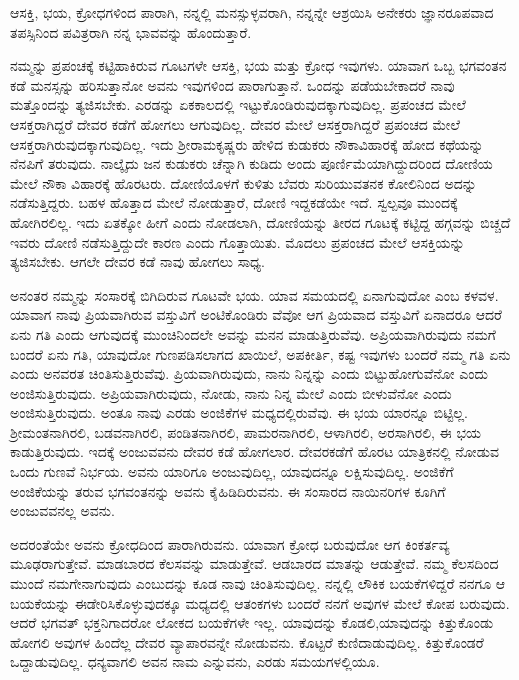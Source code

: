 \begin{artha}
ಆಸಕ್ತಿ, ಭಯ, ಕ್ರೋಧಗಳಿಂದ ಪಾರಾಗಿ, ನನ್ನಲ್ಲಿ ಮನಸ್ಸುಳ್ಳವರಾಗಿ, ನನ್ನನ್ನೇ ಆಶ್ರಯಿಸಿ ಅನೇಕರು ಜ್ಞಾನರೂಪವಾದ ತಪಸ್ಸಿನಿಂದ ಪವಿತ್ರರಾಗಿ ನನ್ನ ಭಾವವನ್ನು ಹೊಂದುತ್ತಾರೆ.
\end{artha}

ನಮ್ಮನ್ನು ಪ್ರಪಂಚಕ್ಕೆ ಕಟ್ಟಿಹಾಕಿರುವ ಗೂಟಗಳೇ ಆಸಕ್ತಿ, ಭಯ ಮತ್ತು ಕ್ರೋಧ ಇವುಗಳು. ಯಾವಾಗ ಒಬ್ಬ ಭಗವಂತನ ಕಡೆ ಮನಸ್ಸನ್ನು ಹರಿಸುತ್ತಾನೋ ಅವನು ಇವುಗಳಿಂದ ಪಾರಾಗುತ್ತಾನೆ. ಒಂದನ್ನು ಪಡೆಯಬೇಕಾದರೆ ನಾವು ಮತ್ತೊಂದನ್ನು ತ್ಯಜಿಸಬೇಕು. ಎರಡನ್ನು ಏಕಕಾಲದಲ್ಲಿ ಇಟ್ಟುಕೊಂಡಿರುವುದಕ್ಕಾಗುವುದಿಲ್ಲ. ಪ್ರಪಂಚದ ಮೇಲೆ ಆಸಕ್ತರಾಗಿದ್ದರೆ ದೇವರ ಕಡೆಗೆ ಹೋಗಲು ಆಗುವುದಿಲ್ಲ. ದೇವರ ಮೇಲೆ ಆಸಕ್ತರಾಗಿದ್ದರೆ ಪ್ರಪಂಚದ ಮೇಲೆ ಆಸಕ್ತರಾಗಿರುವುದಕ್ಕಾಗುವುದಿಲ್ಲ. ಇದು ಶ‍್ರೀರಾಮಕೃಷ್ಣರು ಹೇಳಿದ ಕುಡುಕರು ನೌಕಾವಿಹಾರಕ್ಕೆ ಹೋದ ಕಥೆಯನ್ನು ನೆನಪಿಗೆ ತರುವುದು. ನಾಲ್ಕೈದು ಜನ ಕುಡುಕರು ಚೆನ್ನಾಗಿ ಕುಡಿದು ಅಂದು ಪೂರ್ಣಿಮೆಯಾಗಿ\-ದ್ದುದರಿಂದ ದೋಣಿಯ ಮೇಲೆ ನೌಕಾ ವಿಹಾರಕ್ಕೆ ಹೊರಟರು. ದೋಣಿಯೊಳಗೆ ಕುಳಿತು ಬೆವರು ಸುರಿಯುವತನಕ ಕೋಲಿನಿಂದ ಅದನ್ನು ನಡೆಸುತ್ತಿದ್ದರು. ಬಹಳ ಹೊತ್ತಾದ ಮೇಲೆ ನೋಡುತ್ತಾರೆ, ದೋಣಿ ಇದ್ದಕಡೆಯೇ ಇದೆ. ಸ್ವಲ್ಪವೂ ಮುಂದಕ್ಕೆ ಹೋಗಿರಲಿಲ್ಲ. ಇದು ಏತಕ್ಕೋ ಹೀಗೆ ಎಂದು ನೋಡಲಾಗಿ, ದೋಣಿಯನ್ನು ತೀರದ ಗೂಟಕ್ಕೆ ಕಟ್ಟಿದ್ದ ಹಗ್ಗವನ್ನು ಬಿಚ್ಚದೆ ಇವರು ದೋಣಿ ನಡೆಸುತ್ತಿದ್ದುದೇ ಕಾರಣ ಎಂದು ಗೊತ್ತಾಯಿತು. ಮೊದಲು ಪ್ರಪಂಚದ ಮೇಲೆ ಆಸಕ್ತಿಯನ್ನು ತ್ಯಜಿಸಬೇಕು. ಆಗಲೇ ದೇವರ ಕಡೆ ನಾವು ಹೋಗಲು ಸಾಧ್ಯ.

ಅನಂತರ ನಮ್ಮನ್ನು ಸಂಸಾರಕ್ಕೆ ಬಿಗಿದಿರುವ ಗೂಟವೇ ಭಯ. ಯಾವ ಸಮಯದಲ್ಲಿ ಏನಾಗುವುದೋ ಎಂಬ ಕಳವಳ. ಯಾವಾಗ ನಾವು ಪ್ರಿಯವಾಗಿರುವ ವಸ್ತುವಿಗೆ ಅಂಟಿಕೊಂಡಿರು ವೆವೋ ಆಗ ಪ್ರಿಯವಾದ ವಸ್ತುವಿಗೆ ಏನಾದರೂ ಆದರೆ ಏನು ಗತಿ ಎಂದು ಆಗುವುದಕ್ಕೆ ಮುಂಚಿನಿಂದಲೇ ಅವನ್ನು ಮನನ ಮಾಡುತ್ತಿರುವೆವು. ಅಪ್ರಿಯವಾಗಿರುವುದು ನಮಗೆ ಬಂದರೆ ಏನು ಗತಿ, ಯಾವುದೋ ಗುಣಪಡಿಸಲಾಗದ ಖಾಯಿಲೆ, ಅಪಕೀರ್ತಿ, ಕಷ್ಟ ಇವುಗಳು ಬಂದರೆ ನಮ್ಮ ಗತಿ ಏನು ಎಂದು ಅನವರತ ಚಿಂತಿಸುತ್ತಿರುವೆವು. ಪ್ರಿಯವಾಗಿರುವುದು, ನಾನು ನಿನ್ನನ್ನು ಎಂದು ಬಿಟ್ಟುಹೋಗುವೆನೋ ಎಂದು ಅಂಜಿಸುತ್ತಿರುವುದು. ಅಪ್ರಿಯವಾಗಿರುವುದು, ನೋಡು, ನಾನು ನಿನ್ನ ಮೇಲೆ ಎಂದು ಬೀಳುವೆನೋ ಎಂದು ಅಂಜಿಸುತ್ತಿರುವುದು. ಅಂತೂ ನಾವು ಎರಡು ಅಂಜಿಕೆಗಳ ಮಧ್ಯದಲ್ಲಿರುವೆವು. ಈ ಭಯ ಯಾರನ್ನೂ ಬಿಟ್ಟಿಲ್ಲ. ಶ‍್ರೀಮಂತನಾಗಿರಲಿ, ಬಡವನಾಗಿರಲಿ, ಪಂಡಿತನಾಗಿರಲಿ, ಪಾಮರನಾಗಿರಲಿ, ಆಳಾಗಿರಲಿ, ಅರಸಾಗಿರಲಿ, ಈ ಭಯ ಕಾಡುತ್ತಿರುವುದು. ಇದಕ್ಕೆ ಅಂಜುವವನು ದೇವರ ಕಡೆ ಹೋಗಲಾರ. ದೇವರಕಡೆಗೆ ಹೊರಟ ಯಾತ್ರಿಕನಲ್ಲಿ ನೋಡುವ ಒಂದು ಗುಣವೆ ನಿರ್ಭಯ. ಅವನು ಯಾರಿಗೂ ಅಂಜುವುದಿಲ್ಲ, ಯಾವುದನ್ನೂ ಲಕ್ಷಿಸುವುದಿಲ್ಲ. ಅಂಜಿಕೆಗೆ ಅಂಜಿಕೆಯನ್ನು ತರುವ ಭಗವಂತನನ್ನು ಅವನು ಕೈಹಿಡಿದಿರುವನು. ಈ ಸಂಸಾರದ ನಾಯಿನರಿಗಳ ಕೂಗಿಗೆ ಅಂಜುವವನಲ್ಲ ಅವನು.

ಅದರಂತೆಯೇ ಅವನು ಕ್ರೋಧದಿಂದ ಪಾರಾಗಿರುವನು. ಯಾವಾಗ ಕ್ರೋಧ ಬರುವುದೋ ಆಗ ಕಿಂಕರ್ತವ್ಯ ಮೂಢರಾಗುತ್ತೇವೆ. ಮಾಡಬಾರದ ಕೆಲಸವನ್ನು ಮಾಡುತ್ತೇವೆ. ಆಡಬಾರದ ಮಾತನ್ನು ಆಡುತ್ತೇವೆ. ನಮ್ಮ ಕೆಲಸದಿಂದ ಮುಂದೆ ನಮಗೇನಾಗುವುದು ಎಂಬುದನ್ನು ಕೂಡ ನಾವು ಚಿಂತಿಸುವುದಿಲ್ಲ. ನನ್ನಲ್ಲಿ ಲೌಕಿಕ ಬಯಕೆಗಳಿದ್ದರೆ ನನಗೂ ಆ ಬಯಕೆಯನ್ನು ಈಡೇರಿಸಿ\-ಕೊಳ್ಳುವುದಕ್ಕೂ ಮಧ್ಯದಲ್ಲಿ ಆತಂಕಗಳು ಬಂದರೆ ನನಗೆ ಅವುಗಳ ಮೇಲೆ ಕೋಪ ಬರುವುದು. ಆದರೆ ಭಗವತ್ ಭಕ್ತನಿಗಾದರೋ ಲೋಕದ ಬಯಕೆಗಳೇ ಇಲ್ಲ. ಯಾವುದನ್ನು ಕೊಡಲಿ,\break ಯಾವುದನ್ನು ಕಿತ್ತುಕೊಂಡು ಹೋಗಲಿ ಅವುಗಳ ಹಿಂದೆಲ್ಲ ದೇವರ ವ್ಯಾಪಾರವನ್ನೇ ನೋಡುವನು. ಕೊಟ್ಟರೆ ಕುಣಿದಾಡುವುದಿಲ್ಲ. ಕಿತ್ತುಕೊಂಡರೆ ಒದ್ದಾಡುವುದಿಲ್ಲ. ಧನ್ಯವಾಗಲಿ ಅವನ ನಾಮ ಎನ್ನುವನು, ಎರಡು ಸಮಯಗಳಲ್ಲಿಯೂ.

